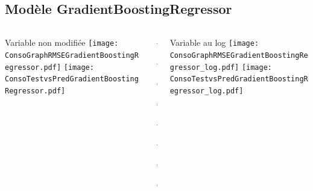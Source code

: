 \documentclass[8pt,aspectratio=169,hyperref={unicode=true}]{beamer}
\begin{document}
\subsection{Modèle GradientBoostingRegressor}
\begin{frame}{\insertsubsection}
  \begin{columns}[t]
    \begin{column}{.31\textwidth}
      \centering Variable non modifiée
      \texttt{[image: ConsoGraphRMSEGradientBoostingRegressor.pdf]}
      \texttt{[image: ConsoTestvsPredGradientBoostingRegressor.pdf]}
    \end{column}
    \begin{column}{.38\textwidth}
      $\Longleftarrow$

      {\footnotesize
          }

      $\Longleftarrow$

      \raggedleft
      $\Longrightarrow$

      {\footnotesize
          }

      $\Longrightarrow$

      \vspace{1cm}

      \raggedright
      $\Longleftarrow$
      {\scriptsize
          }

      $\Longleftarrow$

      \raggedleft
      $\Longrightarrow$

      {\scriptsize
          
        }

      $\Longrightarrow$
    \end{column}
    \begin{column}{.31\textwidth}
      \centering Variable au log
      \texttt{[image: ConsoGraphRMSEGradientBoostingRegressor\_log.pdf]}
      \texttt{[image: ConsoTestvsPredGradientBoostingRegressor\_log.pdf]}
    \end{column}
  \end{columns}
\end{frame}
\end{document}
